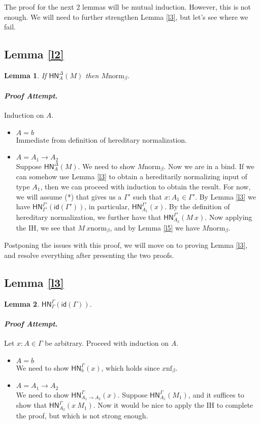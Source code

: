 \documentclass{article}
\newtheorem*{lemm}{Lemma}
\newenvironment{proofattempt}{\paragraph{\emph{Proof Attempt}.}}{\hfill\color{red}{X}\par}
\newcommand{\bnf}[1]{#1 \mathrel{\text{nf}_\beta}}
\newcommand{\bnorm}[1]{\ensuremath{#1 \mathrel{\text{norm}_\beta}}}
\newcommand{\hnorm}[3]{\ensuremath{\mathsf{HN}^{#1}_{#2}(#3)}}
\newcommand{\id}[1]{\ensuremath{\mathsf{id}(#1)}}
\newcommand{\fn}[2]{\ensuremath{#1 \to #2}}
\newcommand{\ap}[2]{\ensuremath{#1\ #2}}
\begin{document}
The proof for the next 2 lemmas will be mutual induction. However, this is not enough. We will need to further
strengthen Lemma \ref{l3}, but let's see where we fail.

\subsection{Lemma \ref{l2}}

\begin{lemm}
If $\hnorm{\Delta}{A}{M}$ then $\bnorm{M}$.
\end{lemm}

\begin{proofattempt}
Induction on $A$.
\begin{itemize}
  \setlength\itemsep{1em}
  \item $A = b$\\
  Immediate from definition of hereditary normalization.
  \item $A = \fn{A_1}{A_2}$\\
  Suppose $\hnorm{\Delta}{A}{M}$. We need to show $\bnorm{M}$. Now we are in a bind. If we can somehow use 
  Lemma \ref{l3} to obtain a hereditarily normalizing input of type $A_1$, then we can proceed with induction 
  to obtain the result. For now, we will assume (*) that gives us a $\Gamma'$ such that $x : A_1 \in \Gamma'$.
  By Lemma \ref{l3} we have $\hnorm{\Gamma'}{\Gamma'}{\id{\Gamma'}}$, in particular, $\hnorm{\Gamma'}{A_1}{x}$. By 
  the definition of hereditary normalization, we further have that $\hnorm{\Gamma'}{A_2}{\ap{M}{x}}$. Now applying the 
  IH, we see that $\bnorm{\ap{M}{x}}$, and by Lemma \ref{l5} we have $\bnorm{M}$. 
  \qedhere
\end{itemize}
\end{proofattempt}

Postponing the issues with this proof, we will move on to proving Lemma \ref{l3}, and resolve everything after
presenting the two proofs.

\subsection{Lemma \ref{l3}}

\begin{lemm}
$\hnorm{\Gamma}{\Gamma}{\id{\Gamma}}$.
\end{lemm}

\begin{proofattempt}
Let $x : A \in \Gamma$ be arbitrary. Proceed with induction on $A$.
\begin{itemize}
  \setlength\itemsep{1em}
  \item $A = b$\\
  We need to show $\hnorm{\Gamma}{b}{x}$, which holds since $\bnf{x}$.
  \item $A = \fn{A_1}{A_2}$\\
  We need to show $\hnorm{\Gamma}{\fn{A_1}{A_2}}{x}$. Suppose $\hnorm{\Gamma}{A_1}{M_1}$, and it suffices to show
  that $\hnorm{\Gamma}{A_2}{\ap{x}{M_1}}$. Now it would be nice to apply the IH to complete the proof, but which
  is not strong enough.
\end{itemize}
\end{proofattempt}
\end{document}
